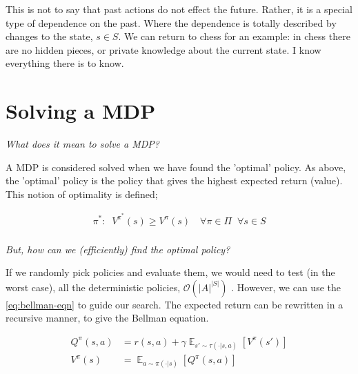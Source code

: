 
This is not to say that past actions do not effect the future. Rather,
it is a special type of dependence on the past. Where the dependence is
totally described by changes to the state, $s\in S$. We can return to chess for
an example: in chess there are no hidden pieces, or
private knowledge about the current state. I know everything there is to know.


\section{Solving a MDP}

\begin{displayquote}
  \textsl{What does it mean to solve a MDP?}
\end{displayquote}

A MDP is considered solved when we have found the 'optimal' policy. As above,
the 'optimal' policy is the policy that gives the highest expected return (value).
This notion of optimality is defined;

\begin{align*}
\pi^{*} : \;\; V^{\pi^* }(s) \ge V^{\pi}(s) \quad \forall \pi\in \Pi \;\;\forall s\in S\\
\end{align*}


\begin{displayquote}
  \textsl{But, how can we (efficiently) find the optimal policy?}
\end{displayquote}

If we randomly pick policies and evaluate them, we would need to test (in the worst case),
all the deterministic policies, $\mathcal O(|A|^{|S|})$ . However, we can use the \ref{eq:bellman-eqn} to
guide our search. The expected return can be rewritten in a recursive manner, to give the Bellman equation.

\begin{align*}
Q^{\pi}(s, a) &= r(s, a) + \gamma \mathop{\mathbb E}_{s' \sim \tau(\cdot|s, a)} [V^{\pi}(s')] \label{eq:bellman-eqn}\tag{Bellman equation}\\
V^{\pi}(s) &= \mathop{\mathbb E}_{a \sim \pi(\cdot|s)} [Q^{\pi}(s, a)]
\end{align*}

